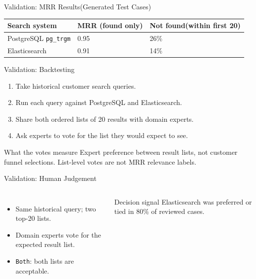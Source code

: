 \documentclass[aspectratio=169]{beamer}
\begin{document}
\begin{frame}{Validation: MRR Results(Generated Test Cases)}
  \begin{center}
    \begin{tabular}{lll}
      \toprule
      Search system & MRR (found only) & Not found(within first 20) \\
      \midrule
      PostgreSQL \texttt{pg\_trgm} & 0.95 & 26\% \\
      Elasticsearch & 0.91 & 14\% \\
      \bottomrule
    \end{tabular}
  \end{center}
\end{frame}

\begin{frame}{Validation: Backtesting}
  \begin{enumerate}
    \item Take historical customer search queries.
    \item Run each query against PostgreSQL and Elasticsearch.
    \item Share both ordered lists of 20 results with domain experts.
    \item Ask experts to vote for the list they would expect to see.
  \end{enumerate}
  \begin{block}{What the votes measure}
    Expert preference between result lists, not customer funnel selections. List-level votes are not MRR relevance labels.
  \end{block}
\end{frame}

\begin{frame}{Validation: Human Judgement}
  \begin{columns}[T,totalwidth=\textwidth]
      \begin{itemize}
        \item Same historical query; two top-20 lists.
        \item Domain experts vote for the expected result list.
        \item \texttt{Both}: both lists are acceptable.
      \end{itemize}

      \vspace{0.25cm}
      \begin{block}{Decision signal}
        Elasticsearch was preferred or tied in 80\% of reviewed cases.
      \end{block}

      \centering
      \resizebox{0.95\linewidth}{!}{}
  \end{columns}
\end{frame}
\end{document}
